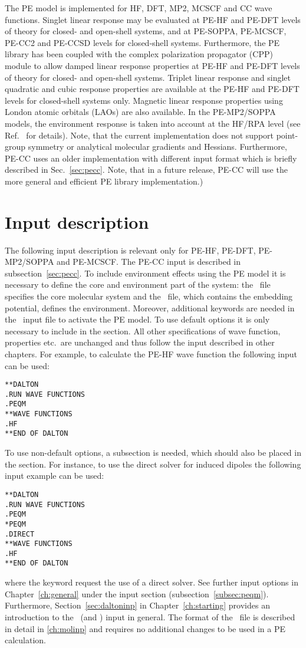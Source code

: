 The PE model is implemented for HF, DFT, MP2, MCSCF and
CC wave functions. Singlet linear response may be evaluated
at PE-HF and PE-DFT levels of theory for closed- and open-shell systems,
and at PE-SOPPA, PE-MCSCF, PE-CC2 and PE-CCSD levels for closed-shell systems.
Furthermore, the PE library has been coupled with the complex polarization
propagator (CPP) module to allow damped linear response properties at
PE-HF and PE-DFT levels of theory for closed- and open-shell systems. Triplet
linear response and singlet quadratic and cubic response properties are available
at the PE-HF and PE-DFT levels for closed-shell systems only. Magnetic linear
response properties using London atomic orbitals (LAOs) are also available.
In the PE-MP2/SOPPA models, the environment response is
taken into account at the HF/RPA level (see Ref.~\cite{pesoppa} for details).
Note, that the current implementation does not support point-group symmetry
or analytical molecular gradients and Hessians.
Furthermore, PE-CC uses
an older implementation with different input format which is briefly described
in Sec.~\ref{sec:pecc}. Note, that in a future release, PE-CC will use the
more general and efficient PE library implementation.)


\section{Input description}
The following input description is relevant only for PE-HF, PE-DFT,
PE-MP2/SOPPA and PE-MCSCF. The PE-CC input is described in
subsection~\ref{sec:pecc}. To include environment effects using the PE model it
is necessary to define the core and environment part of the system: the \molinp\
file specifies the core molecular system and the \potinp\ file, which contains
the embedding potential, defines the environment. Moreover, additional
keywords are needed in the \dalinp\ input file to activate the PE model. To use
default options it is only necessary to include \Key{PEQM} in the \Sec{*DALTON}
section. All other specifications of wave function, properties etc.\ are
unchanged and thus follow the input described in other chapters. For example, to
calculate the PE-HF wave function the following input can be used:
\begin{verbatim}
**DALTON
.RUN WAVE FUNCTIONS
.PEQM
**WAVE FUNCTIONS
.HF
**END OF DALTON
\end{verbatim}
To use non-default options, a  subsection is needed, which should also be placed in the
\Sec{*DALTON} section. For instance, to use the direct solver for induced
dipoles the following input example can be used:
\begin{verbatim}
**DALTON
.RUN WAVE FUNCTIONS
.PEQM
*PEQM
.DIRECT
**WAVE FUNCTIONS
.HF
**END OF DALTON
\end{verbatim}
where the  keyword request the use of a direct solver. See further
input options in Chapter~\ref{ch:general} under the \Sec{PEQM}
input section (subsection~\ref{subsec:peqm}). Furthermore,
Section~\ref{sec:daltoninp} in Chapter~\ref{ch:starting} provides an
introduction to the \dalton\ (and \molinp) input in general. The format of the
\molinp\ file is described in detail in \ref{ch:molinp} and requires no
additional changes to be used in a PE calculation.

